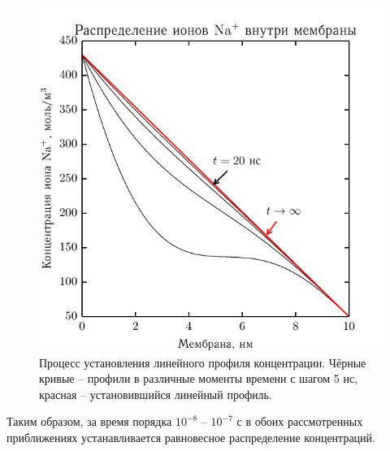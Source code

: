     \begin{figure}[H]
    \begin{center}
        \includegraphics[width=.6\textwidth]{plots/linear_conc}
    \end{center}
    \caption{Процесс установления линейного профиля концентрации. Чёрные кривые
    -- профили в различные моменты времени с шагом 5 нс, красная --
    установившийся линейный профиль.}
    \label{fig:2}
    \end{figure}

    Таким образом, за время порядка \(10^{-8}\) -- \(10^{-7}\) с в обоих
    рассмотренных приближениях устанавливается равновесное распределение
    концентраций.

